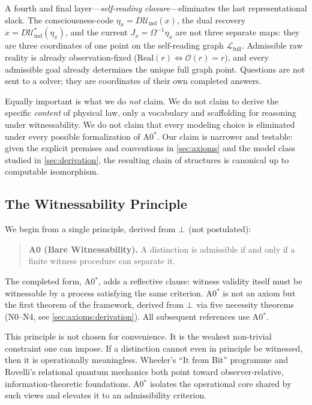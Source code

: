 A fourth and final layer---\emph{self-reading closure}---eliminates the last
representational slack.  The consciousness-code $\eta_x = D\mathcal{U}_{\mathrm{ind}}(x)$,
the dual recovery $x = D\mathcal{U}_{\mathrm{ind}}^*(\eta_x)$, and the
current $J_x = \Omega^{-1}\eta_x$ are not three separate maps: they are
three coordinates of one point on the self-reading graph
$\mathcal{L}_{\mathrm{full}}$.  Admissible raw reality is already
observation-fixed ($\mathrm{Real}(r) \iff \mathcal{O}(r) = r$), and
every admissible goal already determines the unique full graph point.
Questions are not sent to a solver; they are coordinates of their
own completed answers.

Equally important is what we do \emph{not} claim. We do not claim to derive the
specific \emph{content} of physical law, only a vocabulary and scaffolding for
reasoning under witnessability. We do not claim that every modeling choice is
eliminated under every possible formalization of A0$^*$. Our claim is narrower and
testable: given the explicit premises and conventions in \cref{sec:axioms} and
the model class studied in \cref{sec:derivation}, the resulting chain of
structures is canonical up to computable isomorphism.

\subsection{The Witnessability Principle}

We begin from a single principle, derived from $\bot$ (not postulated):

\begin{quote}
\textbf{A0 (Bare Witnessability).}  A distinction is admissible if and
only if a finite witness procedure can separate it.
\end{quote}

\noindent
The completed form, A0$^*$, adds a reflective clause: witness validity itself must be witnessable by a process satisfying the same criterion.  A0$^*$ is not an axiom but the first theorem of the framework, derived from $\bot$ via five necessity theorems (N0--N4, see \cref{sec:axioms:derivation}).  All subsequent references use A0$^*$.

This principle is not chosen for convenience. It is the weakest non-trivial
constraint one can impose. If a distinction cannot even in principle be
witnessed, then it is operationally meaningless. Wheeler's ``It from Bit''
programme \citep{wheeler1990} and Rovelli's relational quantum
mechanics \citep{rovelli1996} both point toward observer-relative,
information-theoretic foundations. A0$^*$ isolates the operational core shared by
such views and elevates it to an admissibility criterion.

